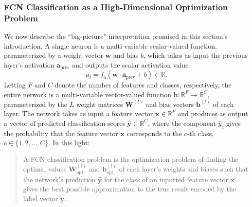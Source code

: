 \documentclass[11pt, a4paper]{article}
\renewcommand{\vec}[1]{\bm{#1}}
\newcommand{\mat}[1]{\mathbf{#1}}
\newcommand{\W}{\mat{W}}
\newcommand{\x}{\vec{x}}
\newcommand{\y}{\vec{y}}
\newcommand{\w}{\vec{w}}
\renewcommand{\b}{\vec{b}}
\renewcommand{\a}{\vec{a}}
\begin{document}
\subsubsection{FCN Classification as a High-Dimensional Optimization Problem} \label{sss:fcn-interpretation}
We now describe the ``big-picture'' interpretation promised in this section's introduction.
A single neuron is a multi-variable scalar-valued function, parameterized by a weight vector $ \w $ and bias $ b $, which takes as input the previous layer's activation $ \a_{\text{prev}} $ and outputs the scalar activation value
\begin{equation*}
    a_{i} = f_{\text{a}} (\w \cdot \a_{\text{prev}} + b) \in \mathbb{R}.
\end{equation*}
Letting $ F $ and $ C $ denote the number of features and classes, respectively, the entire network is a multi-variable vector-valued function $ \vec{h}: \mathbb{R}^{F} \to \mathbb{R}^{C} $, parameterized by the $ L $ weight matrices $ \W^{(l)} $ and bias vectors $ \b^{(l)} $ of each layer.
The network takes as input a feature vector $ \x \in \mathbb{R}^{F} $ and produces as output a vector of predicted classification scores $ \hat{\y} \in \mathbb{R}^{C} $, where the component $ \hat{y}_{c} $ gives the probability that the feature vector $ \x $ corresponds to the $ c $-th class, $ c \in \{1, 2, \ldots, C \} $.
In this light:
\begin{quote}
    A FCN classification problem is the optimization problem of finding the optimal values $ \W_{\text{opt}}^{(l)} $ and $ \b_{\text{opt}}^{(l)} $ of each layer's weights and biases such that the network's prediction $ \hat{\y} $ for the class of an inputted feature vector $ \x $ gives the best possible approximation to the true result encoded by the label vector $ \vec{y} $.
\end{quote}
\end{document}
